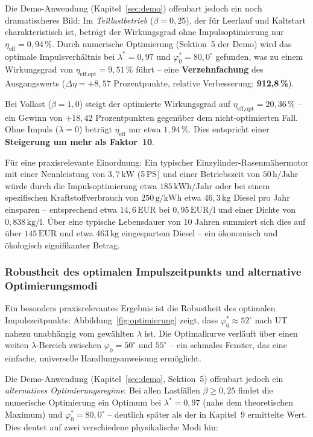 ﻿\documentclass[a4paper,12pt]{article}
\begin{document}
Die Demo-Anwendung (Kapitel~\ref{sec:demo}) offenbart jedoch ein noch
dramatischeres Bild: Im \textit{Teillastbetrieb} ($\beta = 0{,}25$),
der für Leerlauf und Kaltstart charakteristisch ist, beträgt der
Wirkungsgrad ohne Impulsoptimierung nur $\eta_\text{eff} = 0{,}94\,\%$.
Durch numerische Optimierung (Sektion~5 der Demo) wird das optimale
Impulsverhältnis bei $\lambda^* = 0{,}97$ und $\varphi_0^* = 80{,}0^\circ$
gefunden, was zu einem Wirkungsgrad von \textbf{$\eta_\text{eff,opt} = 9{,}51\,\%$}
führt -- eine \textbf{Verzehnfachung} des Ausgangswerts ($\Delta\eta = +8{,}57$
Prozentpunkte, relative Verbesserung: \textbf{912{,}8\,\%}).

Bei Vollast ($\beta = 1{,}0$) steigt der optimierte Wirkungsgrad auf
$\eta_\text{eff,opt} = 20{,}36\,\%$ -- ein Gewinn von $+18{,}42$
Prozentpunkten gegenüber dem nicht-optimierten Fall. Ohne Impuls
($\lambda = 0$) beträgt $\eta_\text{eff}$ nur etwa $1{,}94\,\%$.
Dies entspricht einer \textbf{Steigerung um mehr als Faktor~10}.

Für eine praxisrelevante Einordnung: Ein typischer Einzylinder-Rasenmähermotor
mit einer Nennleistung von $3{,}7\,\text{kW}$ (5\,PS) und einer Betriebszeit
von $50\,\text{h/Jahr}$ würde durch die Impulsoptimierung etwa
$185\,\text{kWh/Jahr}$ oder bei einem spezifischen Kraftstoffverbrauch von
$250\,\text{g/kWh}$ etwa $46{,}3\,\text{kg}$ Diesel pro Jahr einsparen --
entsprechend etwa $14{,}6\,\text{EUR}$ bei $0{,}95\,\text{EUR/l}$ und einer
Dichte von $0{,}838\,\text{kg/l}$. Über eine typische Lebensdauer von
$10$ Jahren summiert sich dies auf über $145\,\text{EUR}$ und etwa
$463\,\text{kg}$ eingespartem Diesel -- ein ökonomisch und ökologisch
signifikanter Betrag.

\subsubsection*{Robustheit des optimalen Impulszeitpunkts und alternative Optimierungsmodi}

Ein besonders praxisrelevantes Ergebnis ist die Robustheit des optimalen
Impulszeitpunkts: Abbildung~\ref{fig:optimierung} zeigt, dass
$\varphi_0^* \approx 52^\circ$ nach UT nahezu unabhängig vom gewählten
$\lambda$ ist. Die Optimalkurve verläuft über einen weiten $\lambda$-Bereich
zwischen $\varphi_0 = 50^\circ$ und $55^\circ$ -- ein schmales Fenster,
das eine einfache, universelle Handlungsanweisung ermöglicht.

Die Demo-Anwendung (Kapitel~\ref{sec:demo}, Sektion~5) offenbart jedoch
ein \textit{alternatives Optimierungsregime}: Bei allen Lastfällen
$\beta \geq 0{,}25$ findet die numerische Optimierung ein Optimum bei
$\lambda^* = 0{,}97$ (nahe dem theoretischen Maximum) und
$\varphi_0^* = 80{,}0^\circ$ -- deutlich später als der in Kapitel~9
ermittelte Wert. Dies deutet auf zwei verschiedene physikalische Modi hin:
\end{document}
